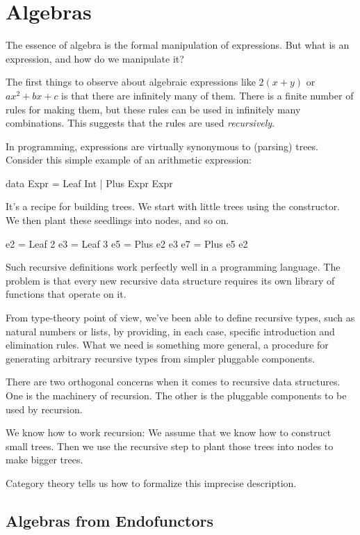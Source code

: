\documentclass[DaoFP]{subfiles}
\begin{document}
\setcounter{chapter}{10}

\chapter{Algebras}

The essence of algebra is the formal manipulation of expressions. But what is an expression, and how do we manipulate it?

The first things to observe about algebraic expressions like $2 (x + y)$ or $a x^2 + b x + c$ is that there are infinitely many of them. There is a finite number of rules for making them, but these rules can be used in infinitely many combinations. This suggests that the rules are used \emph{recursively}. 


In programming, expressions are virtually synonymous to (parsing) trees. Consider this simple example of an arithmetic expression:
\begin{haskell}
data Expr = Leaf Int | Plus Expr Expr
\end{haskell}
It's a recipe for building trees. We start with little trees using the  constructor. We then plant these seedlings into nodes, and so on.
\begin{haskell}
e2 = Leaf 2
e3 = Leaf 3
e5 = Plus e2 e3
e7 = Plus e5 e2
\end{haskell}

Such recursive definitions work perfectly well in a programming language. The problem is that every new recursive data structure requires its own library of functions that operate on it.

From type-theory point of view, we've been able to define recursive types, such as natural numbers or lists, by providing, in each case, specific introduction and elimination rules. What we need is something more general, a procedure for generating arbitrary recursive types from simpler pluggable components. 

There are two orthogonal concerns when it comes to recursive data structures. One is the machinery of recursion. The other is the pluggable components to be used by recursion. 

We know how to work recursion: We assume that we know how to construct small trees. Then we use the recursive step to plant those trees into nodes to make bigger trees. 

Category theory tells us how to formalize this imprecise description.

\section{Algebras from Endofunctors}
\end{document}
